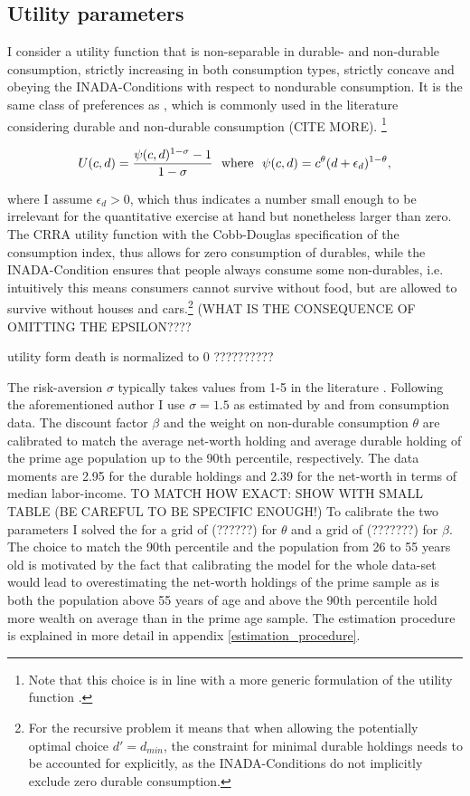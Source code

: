 \documentclass[a4paper,12pt]{article}
\begin{document}
\subsection{Utility parameters}

I consider a utility function that is non-separable in durable- and non-durable consumption, strictly increasing in both consumption types, strictly concave and obeying the INADA-Conditions with respect to nondurable consumption. It is the same class of preferences as \cite{hintermaier2010}, which is commonly used in the literature considering durable and non-durable consumption (CITE MORE). \footnote{Note that this choice is in line with a more generic formulation of the utility function \citep{FV&K2011}.}

\begin{equation}
U(c,d)=\frac{\psi(c,d)^{1-\sigma}-1}{1-\sigma} \ \ \textnormal{where} \ \ \psi(c,d)=c^{\theta}(d+\epsilon_{d})^{1-\theta},
\end{equation}

where I assume $\epsilon_{d} > 0$, which thus indicates a number small enough to be irrelevant for the quantitative exercise at hand but nonetheless larger than zero. The CRRA utility function with the Cobb-Douglas specification of the consumption index, thus allows for zero consumption of durables, while the INADA-Condition ensures that people always consume some non-durables, i.e. intuitively this means consumers cannot survive without food, but are allowed to survive without houses and cars.\footnote{For the recursive problem it means that when allowing the potentially optimal choice $d' = d_{min}$, the constraint for minimal durable holdings needs to be accounted for explicitly, as the INADA-Conditions do not implicitly exclude zero durable consumption.} (WHAT IS THE CONSEQUENCE OF OMITTING THE EPSILON???? 

\citep{FV&K2011} utility form death is normalized to 0 ??????????

The risk-aversion $\sigma$ typically takes values from 1-5 in the literature \citep{yang2009}. Following the aforementioned author I use $\sigma = 1.5$ as estimated by \cite{attanasio1999} and \cite{Gourinchas&Parker2002} from consumption data. The discount factor $\beta$ and the weight on non-durable consumption $\theta$ are calibrated to match the average net-worth holding and average durable holding of the prime age population up to the 90th percentile, respectively. The data moments are 2.95 for the durable holdings and 2.39 for the net-worth in terms of median labor-income. TO MATCH HOW EXACT: SHOW WITH SMALL TABLE (BE CAREFUL TO BE SPECIFIC ENOUGH!) To calibrate the two parameters I solved the for a grid of (??????) for $\theta$ and a grid of (???????) for $\beta$. The choice to match the 90th percentile and the population from 26 to 55 years old is motivated by the fact that calibrating the model for the whole data-set would lead to overestimating the net-worth holdings of the prime sample \textendash as is both the population above 55 years of age and above the 90th percentile hold more wealth on average than in the prime age sample. The estimation procedure is explained in more detail in appendix \ref{estimation_procedure}. 
\end{document}
